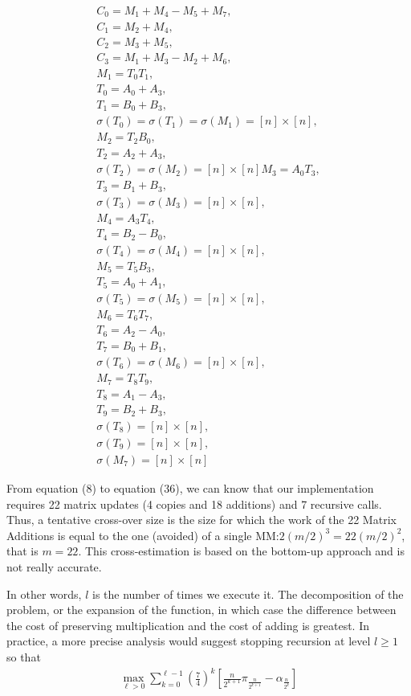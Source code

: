 \documentclass[journal]{IEEEtran}
\begin{document}
\begin{align}
  C_0=M_1+M_4-M_5+M_7,\\
  C_1=M_2+M_4,\\
  C_2=M_3+M_5,\\
  C_3=M_1+M_3-M_2+M_6,\\
  M_1=T_0T_1,\\ 
  T_0=A_0+A_3,\\
  T_1=B_0+B_3,\\
  \sigma(T_0) = \sigma(T_1) = \sigma(M_1) = [n] \times [n],\\ 
  M_2 = T_2B_0,\\
  T_2 = A_2 + A_3,\\ 
  \sigma(T_2) = \sigma(M_2) = [n] \times [n] 
  M_3 = A_0T_3,\\
  T_3 = B_1 + B_3,\\ 
  \sigma(T_3) = \sigma(M_3) = [n] \times [n],\\ 
  M_4 = A_3T_4,\\
  T_4 = B_2-B_0,\\
  \sigma(T_4) = \sigma(M_4) = [n] \times [n],\\
  M_5 = T_5B_3,\\
  T_5 = A_0 + A_1,\\
  \sigma(T_5) = \sigma(M_5) = [n] \times [n],\\
  M_6 = T_6T_7,\\
  T_6 = A_2 - A_0,\\
  T_7 = B_0 + B_1,\\
  \sigma(T_6) = \sigma(M_6) = [n] \times [n],\\
  M_7 = T_8T_9,\\
  T_8 = A_1 - A_3,\\
  T_9 = B_2 + B_3,\\
  \sigma(T_8) = [n] \times [n],\\
  \sigma(T_9) = [n] \times [n],\\ 
  \sigma(M_7) = [n] \times [n]
\end{align}


From equation (8) to equation (36), we can know that our implementation requires 22 matrix updates (4 copies and 18 additions) and 7 recursive calls.
Thus, a tentative cross-over size is the size for which the work of the 22 Matrix Additions is equal to the one (avoided) of a single MM:$2(m/2)^3=22(m/2)^2$,
that is $m = 22$.
This cross-estimation is based on the bottom-up approach and is not really accurate.


In other words, $l$ is the number of times we execute it.
The decomposition of the problem, or the expansion of the function, in which case the difference between the cost of preserving multiplication and the cost of adding is greatest.
In practice, a more precise analysis would suggest stopping recursion at level $l\geq 1$ so that
\begin{align}
  \max _{\ell>0}\sum_{k=0}^{\ell-1}\left(\frac{7}{4}\right)^{k}\left[\frac{n}{2^{k+1}} \pi_{\frac{n}{2^{k+1}}} - \alpha_{\frac{n}{2^k}}\right]
\end{align}
\end{document}
